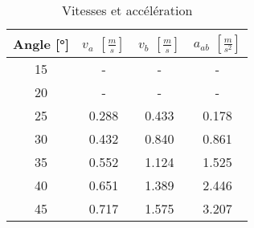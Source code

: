 \begin{table}
\centering
\begin{tabular}{|c|c|c|c|}
\hline
Angle [°] &$v_a$ $\left[ \frac{m}{s} \right]$ & $v_b$ $\left[ \frac{m}{s} \right]$ & $a_{ab}$ $\left[ \frac{m}{s^2} \right]$ \\
           \hline
15        &- & - & - \\
           \hline
20        &- & - & - \\
           \hline
25        &0.288 & 0.433 & 0.178 \\
           \hline
30        &0.432 & 0.840 & 0.861 \\
           \hline
35        &0.552 & 1.124 & 1.525 \\
           \hline
40        &0.651 & 1.389 & 2.446 \\
           \hline
45        &0.717 & 1.575 & 3.207 \\
           \hline
\end{tabular}
\caption{Vitesses et accélération}
\label{table:v-app}
\end{table}
